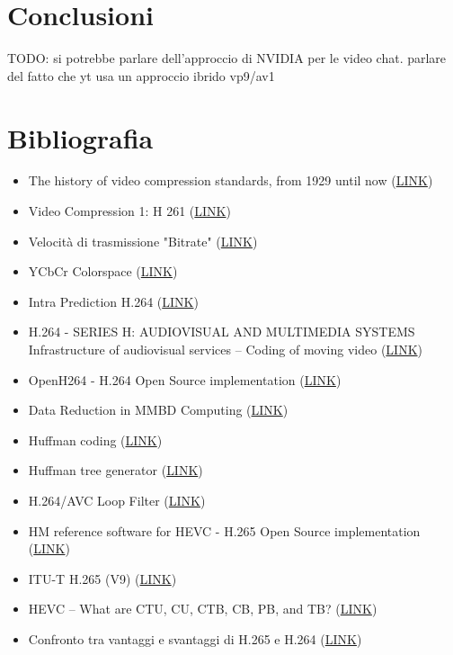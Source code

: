 \documentclass[a4paper,12pt, oneside]{article}
\begin{document}
\section{Conclusioni}
TODO: si potrebbe parlare dell'approccio di NVIDIA per le video chat.
parlare del fatto che yt usa un approccio ibrido vp9/av1

\section{Bibliografia}

\begin{multicols}{2}
\begin{itemize}[label={}]
    \item The history of video compression standards, from 1929 until now (\href{https://api.video/blog/video-trends/the-history-of-video-compression-starts-in-1929/}{LINK})
    \item Video Compression 1: H 261 (\href{https://users.ece.utexas.edu/~ryerraballi/MSB/pdfs/M4L2.pdf}{LINK})
    \item Velocità di trasmissione "Bitrate" (\href{https://it.wikipedia.org/wiki/Velocit%C3%A0_di_trasmissione}{LINK})
    \item YCbCr Colorspace (\href{https://en.wikipedia.org/wiki/YCbCr}{LINK})
    \item Intra Prediction H.264 (\href{https://www.sciencedirect.com/topics/computer-science/intra-prediction}{LINK})

    \item H.264 - SERIES H: AUDIOVISUAL AND MULTIMEDIA SYSTEMS 
        Infrastructure of audiovisual services – Coding of moving 
        video (\href{https://www.itu.int/rec/T-REC-H.264-202108-I/en}{LINK})
    \item OpenH264 - H.264 Open Source implementation (\href{https://github.com/cisco/openh264}{LINK})
    \item Data Reduction in MMBD Computing  (\href{https://www.researchgate.net/publication/334546287_Data_Reduction_in_MMBD_Computing#pf17}{LINK})
    \item Huffman coding (\href{https://en.wikipedia.org/wiki/Huffman_coding}{LINK})
    \item Huffman tree generator (\href{https://suhaan-bhandary.github.io/Huffman-Coding/}{LINK})

    \item H.264/AVC Loop Filter (\href{https://www.vcodex.com/h264avc-loop-filter}{LINK})
    \item HM reference software for HEVC - H.265 Open Source implementation (\href{https://vcgit.hhi.fraunhofer.de/jvet/HM}{LINK})
    \item ITU-T H.265 (V9) (\href{https://www.itu.int/rec/T-REC-H.265-202309-I/en}{LINK})
    \item HEVC – What are CTU, CU, CTB, CB, PB, and TB? (\href{https://codesequoia.wordpress.com/2012/10/28/hevc-ctu-cu-ctb-cb-pb-and-tb/}{LINK})
    \item Confronto tra vantaggi e svantaggi di H.265 e H.264 (\href{https://zhuanlan.zhihu.com/p/519752821}{LINK})


\end{itemize}
\end{multicols}
\end{document}
